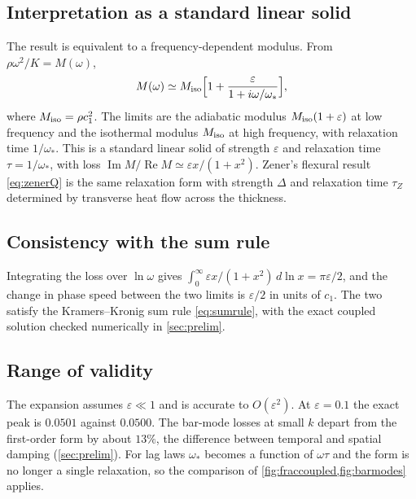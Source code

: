 \subsection{Interpretation as a standard linear solid}
The result is equivalent to a frequency-dependent modulus. From $\rho\omega^2/K=M(\omega)$,
\begin{equation}
M(\omega)\simeq M_{\rm iso}\Bigl[1+\frac{\varepsilon}{1+i\omega/\omega_*}\Bigr],
\end{equation}
where $M_{\rm iso}=\rho c_1^2$. The limits are the adiabatic modulus $M_{\rm iso}(1+\varepsilon)$ at low frequency and the isothermal modulus $M_{\rm iso}$ at high frequency, with relaxation time $1/\omega_*$. This is a standard linear solid of strength $\varepsilon$ and relaxation time $\tau=1/\omega_*$, with loss $\operatorname{Im}M/\operatorname{Re}M\simeq\varepsilon x/(1+x^2)$. Zener's flexural result \cref{eq:zenerQ} is the same relaxation form with strength $\Delta$ and relaxation time $\tau_Z$ determined by transverse heat flow across the thickness.

\subsection{Consistency with the sum rule}
Integrating the loss over $\ln\omega$ gives $\int_0^\infty\varepsilon x/(1+x^2)\,d\ln x=\pi\varepsilon/2$, and the change in phase speed between the two limits is $\varepsilon/2$ in units of $c_1$. The two satisfy the Kramers--Kronig sum rule \cref{eq:sumrule}, with the exact coupled solution checked numerically in \cref{sec:prelim}.

\subsection{Range of validity}
The expansion assumes $\varepsilon\ll1$ and is accurate to $O(\varepsilon^2)$. At $\varepsilon=0.1$ the exact peak is $0.0501$ against $0.0500$. The bar-mode losses at small $k$ depart from the first-order form by about $13\%$, the difference between temporal and spatial damping (\cref{sec:prelim}). For lag laws $\omega_*$ becomes a function of $\omega\tau$ and the form is no longer a single relaxation, so the comparison of \cref{fig:fraccoupled,fig:barmodes} applies.
